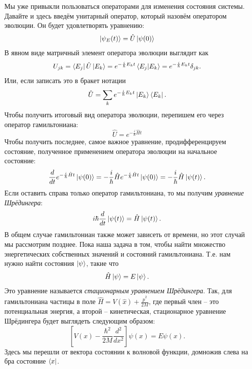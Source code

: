 Мы уже привыкли пользоваться операторами для изменения состояния системы. Давайте и здесь введём унитарный оператор, который назовём оператором эволюции. Он будет удовлетворять уравнению:
\[
\ket{\psi_E(t)} = \hat{U}\ket{\psi(0)}
\]
В явном виде матричный элемент оператора эволюции выглядит как
\[
U_{jk} = \bra{E_j}\hat{U}\ket{E_k} = e^{-\frac{i}{\hbar}E_kt}\bra{E_j}\ket{E_k} = e^{-\frac{i}{\hbar}E_kt}\delta_{jk}.
\]
Или, если записать это в бракет нотации
\[
\hat{U} = \sum_{k}e^{-\frac{i}{\hbar}E_kt}\ket{E_k}\bra{E_k}.
\]
Чтобы получить итоговый вид оператора эволюции, перепишем его через оператор гамильтониана: 
\[
\hat{U} = e^{-\frac{i}{\hbar}\hat{H}t}
\]
Чтобы получить последнее, самое важное уравнение, продифференцируем состояние, полученное применением оператора эволюции на начальное состояние:
\[
\frac{d}{dt}e^{-\frac{i}{\hbar}\hat{H}t}\ket{\psi(0)} = -\frac{i}{\hbar}\hat{H}e^{-\frac{i}{\hbar}\hat{H}t}\ket{\psi(0)} = -\frac{i}{\hbar}\hat{H}\ket{\psi(t)}.
\]
Если оставить справа только оператор гамильтониана, то мы получим \textit{уравнение Шрёдингера}:
\[
i\hbar\frac{d}{dt}\ket{\psi(t)} = \hat{H}\ket{\psi(t)}.
\]
В общем случае гамильтониан также может зависеть от времени, но этот случай мы рассмотрим позднее. Пока наша задача в том, чтобы найти множество энергетических собственных значений и состояний гамильтониана. Т.е. нам нужно найти состояния $\ket{\psi}$, такие что
\[
\hat{H}\ket{\psi} = E\ket{\psi}.
\]
Это уравнение называется \textit{стационарным уравнением Шрёдингера}. Так, для гамильтониана частицы в поле $\hat{H} = V(\hat{x}) + \frac{\hat{p}^2}{2M}$, где первый член -- это потенциальная энергия, а второй -- кинетическая, стационарное уравнение Шрёдингера будет выглядеть следующим образом:
\[
\left[V(x) - \frac{\hbar^2}{2M}\frac{d^2}{dx^2}\right]\psi(x) = E\psi(x).
\]
Здесь мы перешли от вектора состоянии к волновой функции, домножив слева на бра состояние $\bra{x}$.

